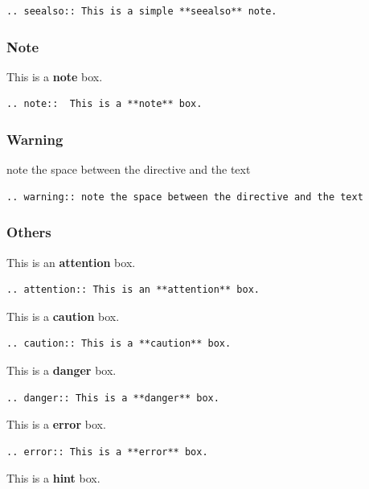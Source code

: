 \begin{verbatim}
.. seealso:: This is a simple **seealso** note. 
\end{verbatim}

\subsubsection{Note}\label{note}

This is a \textbf{note} box.

\begin{verbatim}
.. note::  This is a **note** box.
\end{verbatim}

\subsubsection{Warning}\label{warning}

note the space between the directive and the text

\begin{verbatim}
.. warning:: note the space between the directive and the text
\end{verbatim}

\subsubsection{Others}\label{others}

This is an \textbf{attention} box.

\begin{verbatim}
.. attention:: This is an **attention** box.
\end{verbatim}

This is a \textbf{caution} box.

\begin{verbatim}
.. caution:: This is a **caution** box.
\end{verbatim}

This is a \textbf{danger} box.

\begin{verbatim}
.. danger:: This is a **danger** box.
\end{verbatim}

This is a \textbf{error} box.

\begin{verbatim}
.. error:: This is a **error** box.
\end{verbatim}

This is a \textbf{hint} box.

